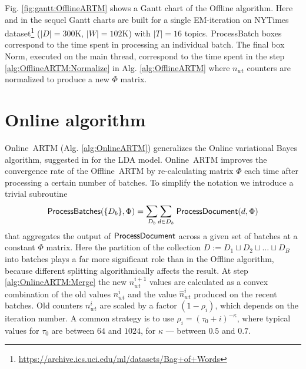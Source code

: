\documentclass[russian,english]{llncs}
\newcommand{\kw}[1]{\mbox{\textsf{#1}}}
\begin{document}
Fig. \ref{fig:gantt:OfflineARTM} shows a Gantt chart of the \kw{Offline} algorithm.
Here and in the sequel Gantt charts are built for a single EM-iteration on
\kw{NYTimes} dataset\footnote{\url{https://archive.ics.uci.edu/ml/datasets/Bag+of+Words}}
($|D|=300$K, $|W|=102$K) with $|T|=16$ topics.
\kw{ProcessBatch} boxes correspond to the time spent in processing an individual batch.
The final box \kw{Norm}, executed on the main thread,
correspond to the time spent in the step \ref{alg:OfflineARTM:Normalize} in Alg. \ref{alg:OfflineARTM}
where $n_{wt}$ counters are normalized to produce a new $\Phi$ matrix.


\section{Online algorithm}
\label{sec:OnlineARTM}

\kw{Online ARTM} (Alg. \ref{alg:OnlineARTM}) generalizes
the Online variational Bayes algorithm,
suggested in \cite{hoffman10online} for the LDA model.
\kw{Online ARTM} improves the convergence rate of the \kw{Offline ARTM}
by re-calculating matrix $\Phi$ each time after processing a certain number of batches.
To simplify the notation
we introduce a trivial subroutine
\[
\kw{ProcessBatches}(\{D_b\}, \Phi) = \mathlarger\sum\limits_{D_b} \mathlarger\sum\limits_{d \in D_b} \; \kw{ProcessDocument}(d, \Phi) \\
\]
that aggregates the output of $\kw{ProcessDocument}$ across a given set of batches at a constant $\Phi$ matrix.
Here the partition of the collection $D := D_1 \sqcup D_2 \sqcup \dots \sqcup D_B$
into batches
plays a far more significant role than in the \kw{Offline} algorithm,
because different splitting algorithmically affects the result.
At step \ref{alg:OnlineARTM:Merge} the new $n_{wt}^{i+1}$ values are calculated as a convex combination
of the old values $n_{wt}^{i}$ and the value $\hat n_{wt}^{i}$ produced on the recent batches.
Old counters $n_{wt}^{i}$ are scaled by a factor $(1 - \rho_i)$,
which depends on the iteration number. A common strategy is to use $\rho_i = (\tau_0 + i)^{-\kappa}$,
where typical values for $\tau_0$ are between $64$ and $1024$, for $\kappa$ --- between $0.5$ and $0.7$.
\end{document}
